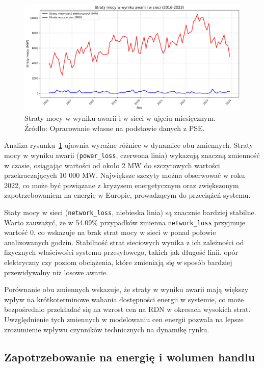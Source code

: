 \begin{figure}[H]
    \centering
    \includegraphics[width=1.0\textwidth]{../plots/losses/power_losses.png}
    \caption{Straty mocy w wyniku awarii i w sieci w ujęciu miesięcznym. Źródło: Opracowanie własne na podstawie danych z PSE.}
    \label{fig:power_losses}
\end{figure}

Analiza rysunku~\ref{fig:power_losses} ujawnia wyraźne różnice w dynamice obu zmiennych. Straty mocy w wyniku awarii (\texttt{power\_loss}, czerwona linia) wykazują znaczną zmienność w czasie, osiągając wartości od około 2 MW do szczytowych wartości przekraczających 10 000 MW. Największe szczyty można obserwować w roku 2022, co może być powiązane z kryzysem energetycznym oraz zwiększonym zapotrzebowaniem na energię w Europie, prowadzącym do przeciążeń systemu.

Staty mocy w sieci (\texttt{network\_loss}, niebieska linia) są znacznie bardziej stabilne. Warto zauważyć, że w 54.09\% przypadków zmienna \texttt{network\_loss} przyjmuje wartość 0, co wskazuje na brak strat mocy w sieci w ponad połowie analizowanych godzin. Stabilność strat sieciowych wynika z ich zależności od fizycznych właściwości systemu przesyłowego, takich jak długość linii, opór elektryczny czy poziom obciążenia, które zmieniają się w sposób bardziej przewidywalny niż losowe awarie.

Porównanie obu zmiennych wskazuje, że straty w wyniku awarii mają większy wpływ na krótkoterminowe wahania dostępności energii w systemie, co może bezpośrednio przekładać się na wzrost cen na RDN w okresach wysokich strat. Uwzględnienie tych zmiennych w modelowaniu cen energii pozwala na lepsze zrozumienie wpływu czynników technicznych na dynamikę rynku.

\subsection{Zapotrzebowanie na energię i wolumen handlu}
\label{subsec:demand}

